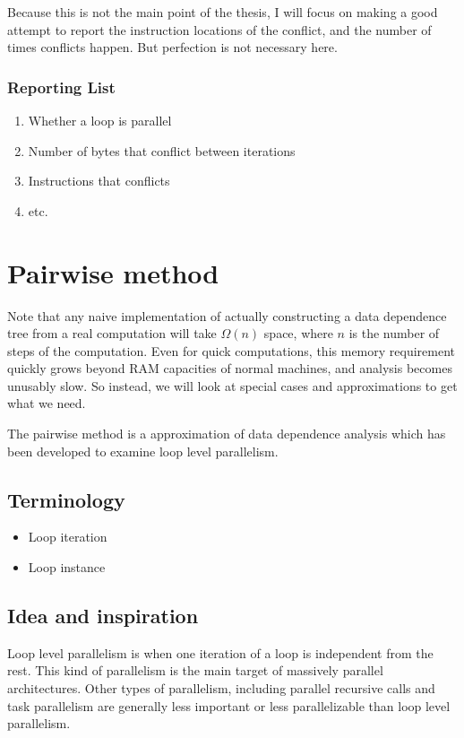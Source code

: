\documentclass[12pt,twoside]{reedthesis}
\begin{document}
		Because this is not the main point of the thesis, I will focus on making a good attempt to report the instruction locations of the conflict, and the number of times conflicts happen. But perfection is not necessary here.

		\subsubsection{Reporting List}
		\begin{enumerate}
			\item Whether a loop is parallel
			\item Number of bytes that conflict between iterations
			\item Instructions that conflicts
			\item etc.
		\end{enumerate}

	\section{Pairwise method}

		Note that any naive implementation of actually constructing a data dependence tree from a real computation will take $\Omega(n)$ space, where $n$ is the number of steps of the computation. Even for quick computations, this memory requirement quickly grows beyond RAM capacities of normal machines, and analysis becomes unusably slow. So instead, we will look at special cases and approximations to get what we need.

		The pairwise method is a approximation of data dependence analysis which has been developed to examine loop level parallelism.

		\subsection{Terminology}
		\begin{itemize}
			\item Loop iteration
			\item Loop instance
		\end{itemize}

		\subsection{Idea and inspiration}

		Loop level parallelism is when one iteration of a loop is independent from the rest. This kind of parallelism is the main target of massively parallel architectures. Other types of parallelism, including parallel recursive calls and task parallelism are generally less important or less parallelizable than loop level parallelism.
\end{document}
